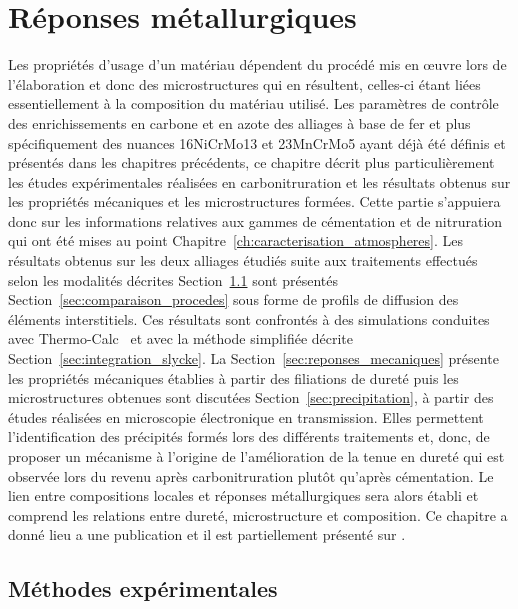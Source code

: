 \chapter{Réponses métallurgiques}
\label{ch:reponse_metallurgique}

\vfill

Les propriétés d'usage d'un matériau dépendent du procédé mis en {\oe}uvre lors de l'élaboration et donc des microstructures qui en résultent, celles-ci étant liées essentiellement à la composition du matériau utilisé. Les paramètres de contrôle des enrichissements en carbone et en azote des alliages à base de fer et plus spécifiquement des nuances 16NiCrMo13 et 23MnCrMo5 ayant déjà été définis et présentés dans les chapitres précédents, ce chapitre décrit plus particulièrement les études expérimentales réalisées en carbonitruration et les résultats obtenus sur les propriétés mécaniques et les microstructures formées. Cette partie s'appuiera donc sur les informations relatives aux gammes de cémentation et de nitruration qui ont été mises au point Chapitre~\ref{ch:caracterisation_atmospheres}. Les résultats obtenus sur les deux alliages étudiés suite aux traitements effectués selon les modalités décrites Section~\ref{sec:methodes_metallurgie} sont présentés Section~\ref{sec:comparaison_procedes} sous forme de profils de diffusion des éléments interstitiels. Ces résultats sont confrontés à des simulations conduites avec Thermo-Calc~\cite{Andersson2002,Borgenstam2000} et avec la méthode simplifiée décrite Section~\ref{sec:integration_slycke}. La Section~\ref{sec:reponses_mecaniques} présente les propriétés mécaniques établies à partir des filiations de dureté puis les microstructures obtenues sont discutées Section~\ref{sec:precipitation}, à partir des études réalisées en microscopie électronique en transmission. Elles permettent l'identification des précipités formés lors des différents traitements et, donc, de proposer un mécanisme à l'origine de l'amélioration de la tenue en dureté qui est observée lors du revenu après carbonitruration plutôt qu'après cémentation. Le lien entre compositions locales et réponses métallurgiques sera alors établi et comprend les relations entre dureté, microstructure et composition. Ce chapitre a donné lieu a une publication et il est partiellement présenté sur \citet{DalMaz2017}.

\vfill\clearpage

\section{Méthodes expérimentales}
\label{sec:methodes_metallurgie}

